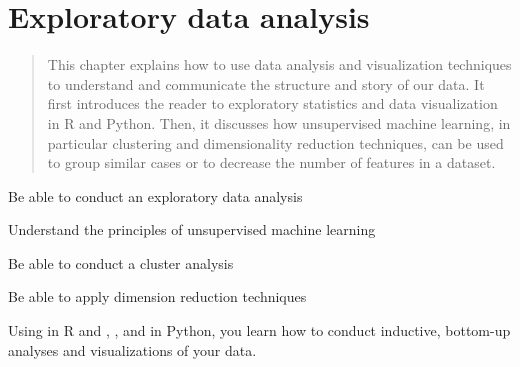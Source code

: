 \chapter{Exploratory data analysis}
\label{chap:eda}

\begin{abstract}
  This chapter explains how to use data analysis and visualization techniques to understand and communicate the structure and story of our data.  It first introduces the reader to exploratory statistics and data visualization in R and Python. Then, it discusses how unsupervised machine learning, in particular clustering and dimensionality reduction techniques, can be used to group similar cases or to decrease the number of features in a dataset.
\end{abstract}



\begin{objectives}
\item Be able to conduct an exploratory data analysis
\item Understand the principles of unsupervised machine learning
\item Be able to conduct a cluster analysis
\item Be able to apply dimension reduction techniques
\end{objectives}

\begin{feature}
Using  in R and , ,  and  in Python, you learn how to conduct inductive, bottom-up analyses and visualizations of your data.
\end{feature}








